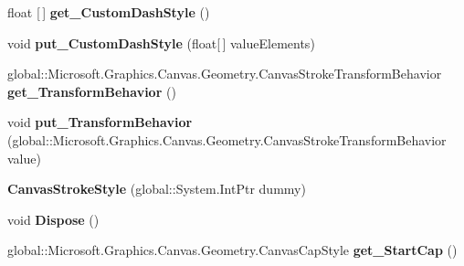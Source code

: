 \begin{DoxyCompactItemize}
\mbox{\label{class_microsoft_1_1_graphics_1_1_canvas_1_1_geometry_1_1_canvas_stroke_style_aed5aa05f608f3835623113c1f789483d}} 
float \mbox{[}$\,$\mbox{]} {\bfseries get\+\_\+\+Custom\+Dash\+Style} ()
\item 
\mbox{\label{class_microsoft_1_1_graphics_1_1_canvas_1_1_geometry_1_1_canvas_stroke_style_aeae34150ee1e2fcb07c434a9371be1da}} 
void {\bfseries put\+\_\+\+Custom\+Dash\+Style} (float\mbox{[}$\,$\mbox{]} value\+Elements)
\item 
\mbox{\label{class_microsoft_1_1_graphics_1_1_canvas_1_1_geometry_1_1_canvas_stroke_style_a26b6c215fb7192fa54e07e53785f0568}} 
global\+::\+Microsoft.\+Graphics.\+Canvas.\+Geometry.\+Canvas\+Stroke\+Transform\+Behavior {\bfseries get\+\_\+\+Transform\+Behavior} ()
\item 
\mbox{\label{class_microsoft_1_1_graphics_1_1_canvas_1_1_geometry_1_1_canvas_stroke_style_acc734915b10b7dd019e5423b04d56a48}} 
void {\bfseries put\+\_\+\+Transform\+Behavior} (global\+::\+Microsoft.\+Graphics.\+Canvas.\+Geometry.\+Canvas\+Stroke\+Transform\+Behavior value)
\item 
\mbox{\label{class_microsoft_1_1_graphics_1_1_canvas_1_1_geometry_1_1_canvas_stroke_style_a84473c4c8d10c25462fa224a25dae41b}} 
{\bfseries Canvas\+Stroke\+Style} (global\+::\+System.\+Int\+Ptr dummy)
\item 
\mbox{\label{class_microsoft_1_1_graphics_1_1_canvas_1_1_geometry_1_1_canvas_stroke_style_ad363b1ddc2f498a833220cbfda7cee42}} 
void {\bfseries Dispose} ()
\item 
\mbox{\label{class_microsoft_1_1_graphics_1_1_canvas_1_1_geometry_1_1_canvas_stroke_style_ad88c6468f388b2eb08a9719477f05865}} 
global\+::\+Microsoft.\+Graphics.\+Canvas.\+Geometry.\+Canvas\+Cap\+Style {\bfseries get\+\_\+\+Start\+Cap} ()

\end{DoxyCompactItemize}
